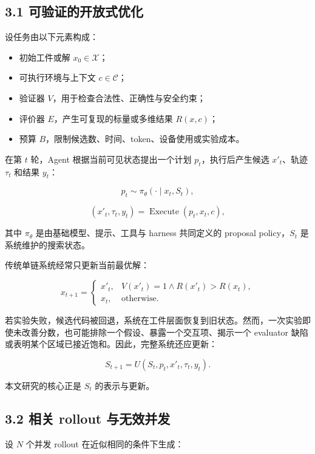 \documentclass[
  11pt]{ctexart}
\providecommand{\tightlist}{%
  \setlength{\itemsep}{0pt}\setlength{\parskip}{0pt}}
\begin{document}
\subsection{3.1
可验证的开放式优化}\label{ux53efux9a8cux8bc1ux7684ux5f00ux653eux5f0fux4f18ux5316}

设任务由以下元素构成：

\begin{itemize}
\tightlist
\item
  初始工件或解 \(x_0 \in \mathcal{X}\)；
\item
  可执行环境与上下文 \(c \in \mathcal{C}\)；
\item
  验证器 \(V\)，用于检查合法性、正确性与安全约束；
\item
  评价器 \(E\)，产生可复现的标量或多维结果 \(R(x,c)\)；
\item
  预算 \(B\)，限制候选数、时间、token、设备使用或实验成本。
\end{itemize}

在第 \(t\) 轮，Agent 根据当前可见状态提出一个计划
\(p_t\)，执行后产生候选 \(x'_t\)、轨迹 \(\tau_t\) 和结果 \(y_t\)：

\[
p_t \sim \pi_\theta(\cdot \mid x_t, S_t),
\]

\[
(x'_t,\tau_t,y_t)=\operatorname{Execute}(p_t,x_t,c),
\]

其中 \(\pi_\theta\) 是由基础模型、提示、工具与 harness 共同定义的
proposal policy，\(S_t\) 是系统维护的搜索状态。

传统单链系统经常只更新当前最优解：

\[
x_{t+1}=
\begin{cases}
 x'_t, & V(x'_t)=1 \land R(x'_t)>R(x_t),\\
 x_t, & \text{otherwise}.
\end{cases}
\]

若实验失败，候选代码被回退，系统在工件层面恢复到旧状态。然而，一次实验即使未改善分数，也可能排除一个假设、暴露一个交互项、揭示一个
evaluator 缺陷或表明某个区域已接近饱和。因此，完整系统还应更新：

\[
S_{t+1}=U(S_t,p_t,x'_t,\tau_t,y_t).
\]

本文研究的核心正是 \(S_t\) 的表示与更新。

\subsection{3.2 相关 rollout
与无效并发}\label{ux76f8ux5173-rollout-ux4e0eux65e0ux6548ux5e76ux53d1}

设 \(N\) 个并发 rollout 在近似相同的条件下生成：
\end{document}
